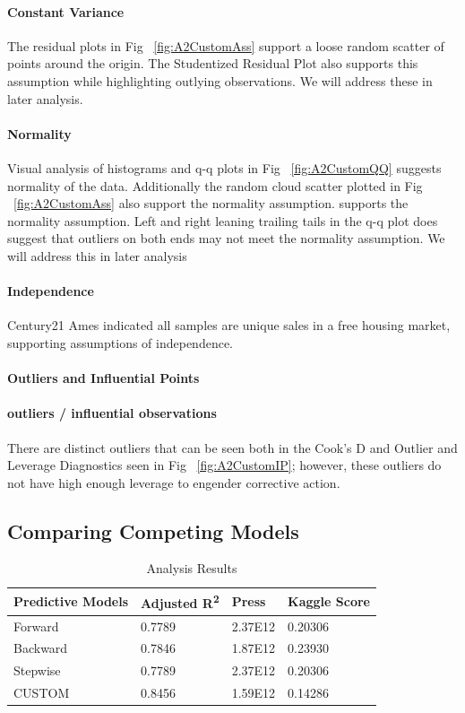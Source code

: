 \documentclass[11pt]{scrartcl} %
\begin{document}
\paragraph{Constant Variance} The residual plots in Fig ~\ref{fig:A2CustomAss} support a loose random scatter of points around the origin. The Studentized Residual Plot also supports this assumption while highlighting outlying observations. We will address these in later analysis.
\paragraph{Normality} Visual analysis of histograms and q-q plots in Fig ~\ref{fig:A2CustomQQ} suggests normality of the data. Additionally the random cloud scatter plotted in Fig ~\ref{fig:A2CustomAss} also support the normality assumption. supports the normality assumption. Left and right leaning trailing tails in the q-q plot does suggest that outliers on both ends may not meet the normality assumption. We will address this in later analysis
\paragraph{Independence} Century21 Ames indicated all samples are unique sales in a free housing market, supporting assumptions of independence. 
\paragraph{Outliers and Influential Points}
\paragraph{outliers / influential observations} There are distinct outliers that can be seen both in the Cook's D and Outlier and Leverage Diagnostics seen in Fig ~\ref{fig:A2CustomIP}; however, these outliers do not have high enough leverage to engender corrective action.

\subsection{Comparing Competing Models}
\begin{table}[h] %
	\centering %
\begin{tabular}{|l|l|l|l|}
\hline
\textbf{Predictive Models} & \textbf{Adjusted R\textsuperscript{2}} & \textbf{Press} & \textbf{Kaggle Score}\\
\hline
Forward & 0.7789 & 2.37E12 & 0.20306\\
\hline
Backward & 0.7846 & 1.87E12 & 0.23930\\
\hline
Stepwise & 0.7789 & 2.37E12 & 0.20306\\
\hline
CUSTOM & 0.8456 & 1.59E12 & 0.14286\\
\hline
\end{tabular}
\caption{Analysis Results}
\label{tab:CCM}
\end{table}
\end{document}
